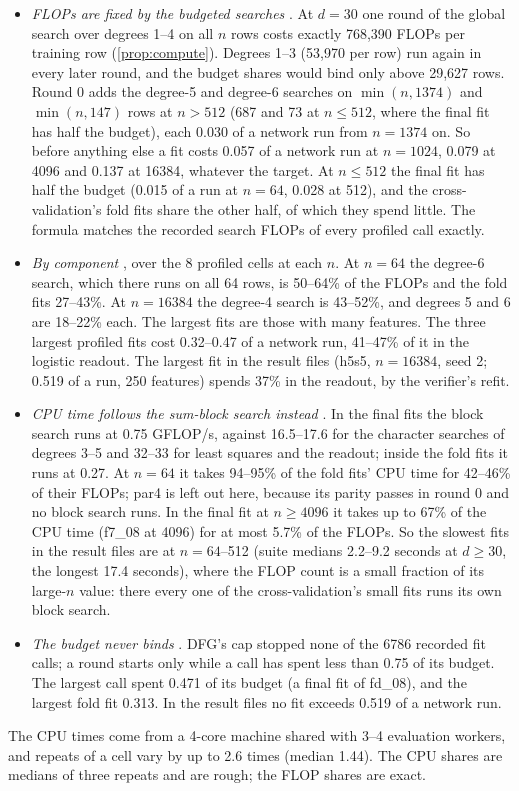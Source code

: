 \begin{itemize}
\item \emph{FLOPs are fixed by the budgeted searches} . At $d=30$ one round of the global search over degrees 1--4 on all $n$ rows costs exactly 768,390 FLOPs per training row (\cref{prop:compute}). Degrees 1--3 (53,970 per row) run again in every later round, and the budget shares would bind only above 29,627 rows. Round 0 adds the degree-5 and degree-6 searches on $\min(n,1374)$ and $\min(n,147)$ rows at $n>512$ (687 and 73 at $n\le512$, where the final fit has half the budget), each 0.030 of a network run from $n=1374$ on. So before anything else a fit costs 0.057 of a network run at $n=1024$, 0.079 at 4096 and 0.137 at 16384, whatever the target. At $n\le512$ the final fit has half the budget (0.015 of a run at $n=64$, 0.028 at 512), and the cross-validation's fold fits share the other half, of which they spend little. The formula matches the recorded search FLOPs of every profiled call exactly.
\item \emph{By component} , over the 8 profiled cells at each $n$. At $n=64$ the degree-6 search, which there runs on all 64 rows, is 50--64\% of the FLOPs and the fold fits 27--43\%. At $n=16384$ the degree-4 search is 43--52\%, and degrees 5 and 6 are 18--22\% each. The largest fits are those with many features. The three largest profiled fits cost 0.32--0.47 of a network run, 41--47\% of it in the logistic readout. The largest fit in the result files (h5s5, $n=16384$, seed 2; 0.519 of a run, 250 features) spends 37\% in the readout, by the verifier's refit.
\item \emph{CPU time follows the sum-block search instead} . In the final fits the block search runs at 0.75 GFLOP/s, against 16.5--17.6 for the character searches of degrees 3--5 and 32--33 for least squares and the readout; inside the fold fits it runs at 0.27. At $n=64$ it takes 94--95\% of the fold fits' CPU time for 42--46\% of their FLOPs; par4 is left out here, because its parity passes in round 0 and no block search runs. In the final fit at $n\ge4096$ it takes up to 67\% of the CPU time (f7\_08 at 4096) for at most 5.7\% of the FLOPs. So the slowest fits in the result files are at $n=64$--512 (suite medians 2.2--9.2 seconds at $d\ge30$, the longest 17.4 seconds), where the FLOP count is a small fraction of its large-$n$ value: there every one of the cross-validation's small fits runs its own block search.
\item \emph{The budget never binds} . DFG's cap stopped none of the 6786 recorded fit calls; a round starts only while a call has spent less than 0.75 of its budget. The largest call spent 0.471 of its budget (a final fit of fd\_08), and the largest fold fit 0.313. In the result files no fit exceeds 0.519 of a network run.
\end{itemize}
The CPU times come from a 4-core machine shared with 3--4 evaluation workers, and repeats of a cell vary by up to 2.6 times (median 1.44). The CPU shares are medians of three repeats and are rough; the FLOP shares are exact.

